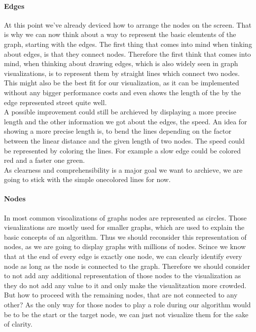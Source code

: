 \documentclass
[
	paper = a4,
    pagesize,
	12 pt,
	oneside,                       %
    open = right,
	DIV = calc,
	BCOR = 0 mm,                   %
	bibtotoc
]
{scrbook}
\begin{document}
\paragraph{Edges}
At this point we've already deviced how to arrange the nodes on the screen.
That is why we can now think about a way to represent the basic elemtents of the graph, starting with the edges.
The first thing that comes into mind when tinking about edges, is that they connect nodes.
Therefore the first think that comes into mind, when thinking about drawing edges, which is also widely seen in graph visualizations, is to represent them by straight lines which connect two nodes.
This might also be the best fit for our visualization, as it can be implemented without any bigger performance costs and even shows the length of the by the edge represented street quite well.\\
A possible improvement could still be archieved by displaying a more precise length and the other information we got about the edges, the speed.
An idea for showing a more precise length is, to bend the lines depending on the factor between the linear distance and the given length of two nodes.
The speed could be represented by coloring the lines.
For example a slow edge could be colored red and a faster one green.\\
As clearness and comprehensibility is a major goal we want to archieve, we are going to stick with the simple onecolored lines for now.


\paragraph{Nodes}
In most common visoalizations of graphs nodes are represented as circles.
Those visualizations are mostly used for smaller graphs, which are used to explain the basic concepts of an algorithm.
Thus we should reconsider this representation of nodes, as we are going to display graphs with millions of nodes.
Scince we know that at the end of every edge is exactly one node, we can clearly identify every node as long as the node is connected to the graph.
Therefore we should consider to not add any additional representation of those nodes to the visualization as they do not add any value to it and only make the visualitzation more crowded.
But how to proceed with the remaining nodes, that are not connected to any other?
As the only way for those nodes to play a role during our algorithm would be to be the start or the target node, we can just not visualize them for the sake of clarity.
\end{document}
